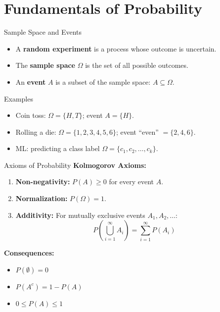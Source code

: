 \section{Fundamentals of Probability}

\begin{frame}{Sample Space and Events}
\begin{itemize}
    \item A \textbf{random experiment} is a process whose outcome is uncertain.
    \item The \textbf{sample space} $\Omega$ is the set of all possible outcomes.
    \item An \textbf{event} $A$ is a subset of the sample space: $A \subseteq \Omega$.
\end{itemize}
\begin{exampleblock}{Examples}
\begin{itemize}
    \item Coin toss: $\Omega = \{H, T\}$; event $A=\{H\}$.
    \item Rolling a die: $\Omega = \{1,2,3,4,5,6\}$; event ``even'' $=\{2,4,6\}$.
    \item ML: predicting a class label $\Omega = \{c_1, c_2, \dots, c_k\}$.
\end{itemize}
\end{exampleblock}
\end{frame}

\begin{frame}{Axioms of Probability}
\textbf{Kolmogorov Axioms:}
\begin{enumerate}
    \item \textbf{Non-negativity:} $P(A) \geq 0$ for every event $A$.
    \item \textbf{Normalization:} $P(\Omega) = 1$.
    \item \textbf{Additivity:} For mutually exclusive events $A_1, A_2, \dots$:
    \[
        P\!\left(\bigcup_{i=1}^{\infty} A_i\right) = \sum_{i=1}^{\infty} P(A_i)
    \]
\end{enumerate}
\vspace{4pt}
\textbf{Consequences:}
\begin{itemize}
    \item $P(\emptyset) = 0$
    \item $P(A^c) = 1 - P(A)$
    \item $0 \le P(A) \le 1$
\end{itemize}
\end{frame}

